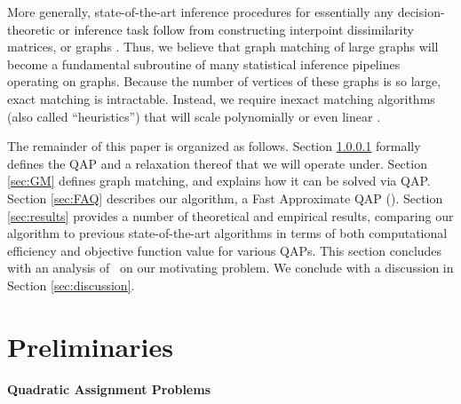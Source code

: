 \documentclass{article} %
\begin{document}
More generally, state-of-the-art inference procedures for essentially any decision-theoretic or inference task follow from constructing interpoint dissimilarity matrices, or graphs \cite{Duin2011}.  Thus, we believe that graph matching of large graphs will become a fundamental subroutine of many statistical inference pipelines operating on graphs. Because the number of vertices of these graphs is so large, exact matching is intractable.   Instead, we require inexact matching algorithms (also called ``heuristics'') that will scale polynomially or even linear \cite{Conte2004}.  

The remainder of this paper is organized as follows.  
Section \ref{sec:QAP} formally defines the QAP and a relaxation thereof that we will operate under.  Section \ref{sec:GM} defines graph matching, and explains how it can be solved via QAP.  
Section \ref{sec:FAQ} describes our algorithm, a Fast Approximate QAP (\FAQ).  Section \ref{sec:results} provides a number of theoretical and empirical results, comparing our algorithm to previous state-of-the-art algorithms in terms of both computational efficiency and objective function value for various QAPs.  This section concludes with an analysis of \FAQ\  on our motivating problem. We conclude with a discussion in Section \ref{sec:discussion}.


\vspace{-5pt}
\section{Preliminaries}

\vspace{-5pt}
\paragraph{Quadratic Assignment Problems} %
\label{sec:QAP}
\end{document}
